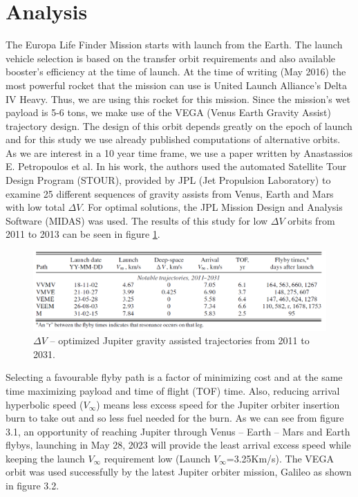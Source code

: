 \section{Analysis}
The Europa Life Finder Mission starts with launch from the Earth. The launch vehicle selection is based on the transfer orbit requirements and also available booster’s efficiency at the time of launch. At the time of writing (May 2016) the most powerful rocket that the mission can use is United Launch Alliance’s Delta IV Heavy. Thus, we are using this rocket for this mission. Since the mission’s wet payload is 5-6 tons, we make use of the VEGA (Venus Earth Gravity Assist) trajectory design. The design of this orbit depends greatly on the epoch of launch and for this study we use already published computations of alternative orbits. As we are interest in a 10 year time frame, we use a paper written by Anastassios E. Petropoulos et al\cite{petropoulos2000a}. In his work, the authors used the automated Satellite Tour Design Program (STOUR), provided by JPL (Jet Propulsion Laboratory) to examine 25 different sequences of gravity assists from Venus, Earth and Mars with low total $\Delta V$. For optimal solutions, the JPL Mission Design and Analysis Software (MIDAS) was used. The results of this study for low $\Delta V$ orbits from 2011 to 2013 can be seen in figure \ref{fig:grav_ass_traj}.

\begin{figure}[htb!]
\centering
\includegraphics[width=1\textwidth]{figures/Orbiter/traj.png}
\caption{$\Delta V$ – optimized Jupiter gravity assisted trajectories from 2011 to 2031. \cite{petropoulos2000a}}\label{fig:grav_ass_traj}
\end{figure}

Selecting a favourable flyby path is a factor of minimizing cost and at the same time maximizing payload and time of flight (TOF) time. Also, reducing arrival hyperbolic speed ($V_{\infty}$) means less excess speed for the Jupiter orbiter insertion burn to take out and so less fuel needed for the burn. As we can see from figure 3.1, an opportunity of reaching Jupiter through Venus – Earth – Mars and Earth flybys, launching in May 28, 2023 will provide the least arrival excess speed while keeping the launch $V_{\infty}$ requirement low (Launch $V_{\infty}$=3.25Km/s). The VEGA orbit was used successfully by the latest Jupiter orbiter mission, Galileo as shown in figure 3.2.

